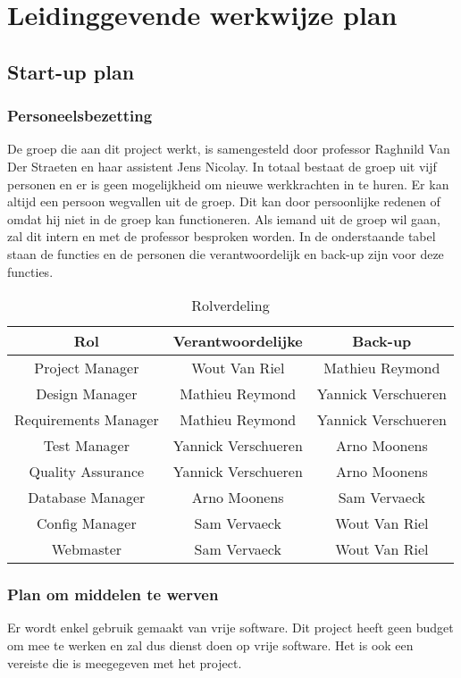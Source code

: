 \section {Leidinggevende werkwijze plan} 

\subsection{Start-up plan}
\subsubsection{Personeelsbezetting}
De groep die aan dit project werkt, is samengesteld door professor Raghnild Van Der Straeten \cite{rvdstrae} en haar assistent Jens Nicolay\cite{jnicolay}. In totaal bestaat de groep uit vijf personen en er is geen mogelijkheid om nieuwe werkkrachten in te huren. Er kan altijd een persoon wegvallen uit de groep. Dit kan door persoonlijke redenen of omdat hij niet in de groep kan functioneren. Als iemand uit de groep wil gaan, zal dit intern en met de professor besproken worden.
In de onderstaande tabel staan de functies en de personen die verantwoordelijk en back-up zijn voor deze functies.

\begin{table}[h]
\centering
\begin{tabular}{c|c|c}
\textbf{Rol} & \textbf{Verantwoordelijke} & \textbf{Back-up}  \\
\hline
 Project Manager & Wout Van Riel & Mathieu Reymond \\
 Design Manager & Mathieu Reymond & Yannick Verschueren \\
 Requirements Manager & Mathieu Reymond & Yannick Verschueren \\
 Test Manager & Yannick Verschueren & Arno Moonens \\
 Quality Assurance & Yannick Verschueren & Arno Moonens \\
 Database Manager & Arno Moonens & Sam Vervaeck \\
 Config Manager & Sam Vervaeck & Wout Van Riel \\
 Webmaster & Sam Vervaeck & Wout Van Riel
\end{tabular}
\caption{Rolverdeling}
\label{tab:rolverdeling}
\end{table}

\subsubsection{Plan om middelen te werven}
Er wordt enkel gebruik gemaakt van vrije software. Dit project heeft geen budget om mee te werken en zal dus dienst doen op vrije software. Het is ook een vereiste die is meegegeven met het project. 

